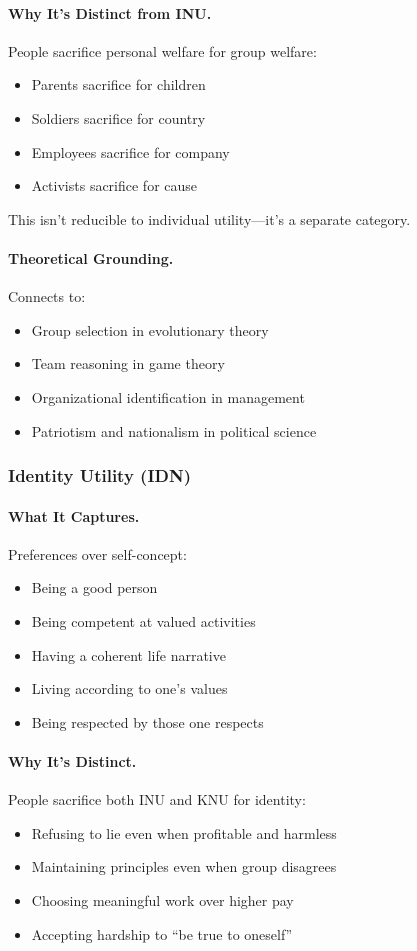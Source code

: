 \documentclass[12pt,a4paper]{article}
\begin{document}
\paragraph{Why It's Distinct from INU.}
People sacrifice personal welfare for group welfare:
\begin{itemize}
  \item Parents sacrifice for children
  \item Soldiers sacrifice for country
  \item Employees sacrifice for company
  \item Activists sacrifice for cause
\end{itemize}

This isn't reducible to individual utility---it's a separate category.

\paragraph{Theoretical Grounding.}
Connects to:
\begin{itemize}
  \item Group selection in evolutionary theory
  \item Team reasoning in game theory
  \item Organizational identification in management
  \item Patriotism and nationalism in political science
\end{itemize}

\subsubsection{Identity Utility (IDN)}

\paragraph{What It Captures.}
Preferences over self-concept:
\begin{itemize}
  \item Being a good person
  \item Being competent at valued activities
  \item Having a coherent life narrative
  \item Living according to one's values
  \item Being respected by those one respects
\end{itemize}

\paragraph{Why It's Distinct.}
People sacrifice both INU and KNU for identity:
\begin{itemize}
  \item Refusing to lie even when profitable and harmless
  \item Maintaining principles even when group disagrees
  \item Choosing meaningful work over higher pay
  \item Accepting hardship to ``be true to oneself''
\end{itemize}
\end{document}
